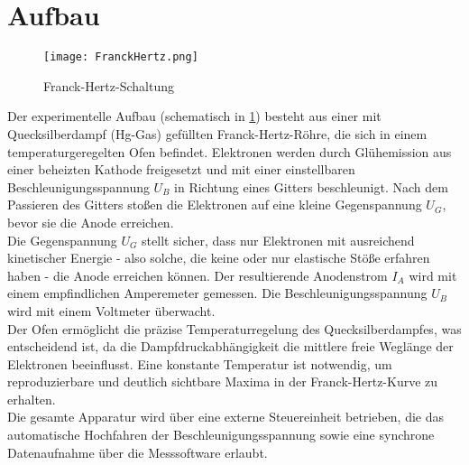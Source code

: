 \section{Aufbau}

\begin{figure}[H]
    \centering
    \texttt{[image: FranckHertz.png]}
    \caption{Franck-Hertz-Schaltung \cite{FranckHertzHg}} 
    \label{fig:FrankHertzSchaltung}    
\end{figure}

Der experimentelle Aufbau (schematisch in \cref{fig:FrankHertzSchaltung}) besteht aus einer mit Quecksilberdampf (Hg-Gas) gefüllten Franck-Hertz-Röhre, die sich in einem temperaturgeregelten Ofen befindet. Elektronen werden durch Glühemission aus einer beheizten Kathode freigesetzt und mit einer einstellbaren Beschleunigungsspannung $ U_B $ in Richtung eines Gitters beschleunigt. Nach dem Passieren des Gitters stoßen die Elektronen auf eine kleine Gegenspannung $ U_G $, bevor sie die Anode erreichen.
\vspace{0.3cm}\\
Die Gegenspannung $ U_G $ stellt sicher, dass nur Elektronen mit ausreichend kinetischer Energie - also solche, die keine oder nur elastische Stöße erfahren haben - die Anode erreichen können. Der resultierende Anodenstrom $ I_A $ wird mit einem empfindlichen Amperemeter gemessen. Die Beschleunigungsspannung $ U_B $ wird mit einem Voltmeter überwacht.
\vspace{0.3cm}\\
Der Ofen ermöglicht die präzise Temperaturregelung des Quecksilberdampfes, was entscheidend ist, da die Dampfdruckabhängigkeit die mittlere freie Weglänge der Elektronen beeinflusst. Eine konstante Temperatur ist notwendig, um reproduzierbare und deutlich sichtbare Maxima in der Franck-Hertz-Kurve zu erhalten.
\vspace{0.3cm}\\
Die gesamte Apparatur wird über eine externe Steuereinheit betrieben, die das automatische Hochfahren der Beschleunigungsspannung sowie eine synchrone Datenaufnahme über die Messsoftware erlaubt.
\vspace{0.3cm}\\

